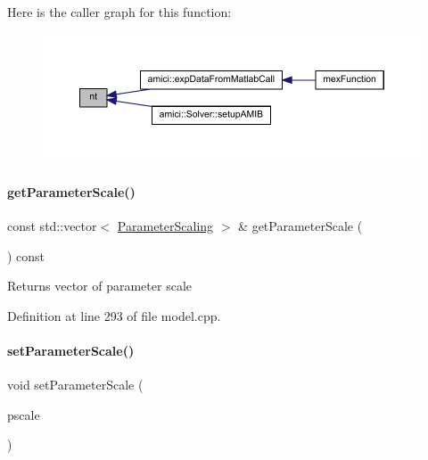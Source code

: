 Here is the caller graph for this function\+:
\nopagebreak
\begin{figure}[H]
\begin{center}
\leavevmode
\includegraphics[width=350pt]{classamici_1_1_model_a4c23d300cbe15b0afb1ee3731d47cc93_icgraph}
\end{center}
\end{figure}
\mbox{\label{classamici_1_1_model_ab14620b22a79748a09a88b9311a7f6d5}} 
\paragraph{\texorpdfstring{get\+Parameter\+Scale()}{getParameterScale()}}
{\footnotesize\ttfamily const std\+::vector$<$ \mbox{\hyperlink{namespaceamici_a42f062082226e9284c201d9eab71a3a0}{Parameter\+Scaling}} $>$ \& get\+Parameter\+Scale (\begin{DoxyParamCaption}{ }\end{DoxyParamCaption}) const}

\begin{DoxyReturn}{Returns}
vector of parameter scale 
\end{DoxyReturn}


Definition at line 293 of file model.\+cpp.

\mbox{\label{classamici_1_1_model_a7e25febbfd9db80f64a4f73a2718bda7}} 
\paragraph{\texorpdfstring{set\+Parameter\+Scale()}{setParameterScale()}\hspace{0.1cm}{\footnotesize\ttfamily [1/2]}}
{\footnotesize\ttfamily void set\+Parameter\+Scale (\begin{DoxyParamCaption}\item[{\mbox{\hyperlink{namespaceamici_a42f062082226e9284c201d9eab71a3a0}{Parameter\+Scaling}}}]{pscale }\end{DoxyParamCaption})}


